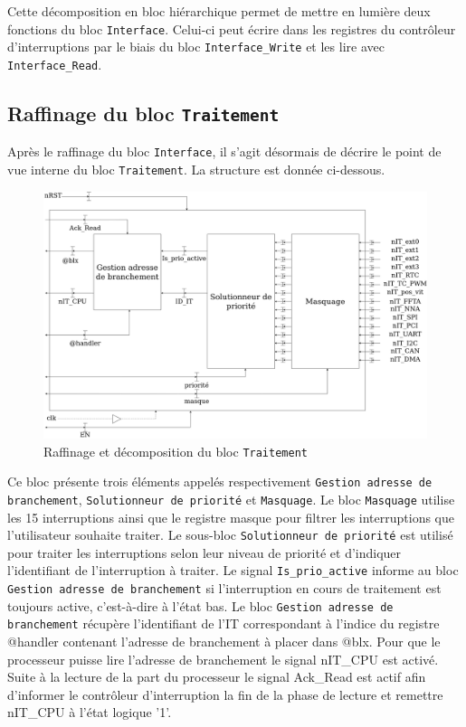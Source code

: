 Cette décomposition en bloc hiérarchique permet de mettre en lumière deux fonctions du bloc \texttt{Interface}.
Celui-ci peut écrire dans les registres du contrôleur d'interruptions par le biais du bloc \texttt{Interface\_Write} et les lire avec \texttt{Interface\_Read}.

\newpage

\subsection{Raffinage du bloc \texttt{Traitement}}

Après le raffinage du bloc \texttt{Interface}, il s'agit désormais de décrire le point de vue interne du bloc \texttt{Traitement}.
La structure est donnée ci-dessous.

\begin{figure}[H]
	\centering
	\includegraphics[width=1\linewidth]{figure/raffinage_traitement.png}
	\caption{Raffinage et décomposition du bloc \texttt{Traitement}}
	\label{fig:raffinage_traitement}
\end{figure}

Ce bloc présente trois éléments appelés respectivement \texttt{Gestion adresse de branchement}, \texttt{Solutionneur de priorité} et \texttt{Masquage}.
Le bloc \texttt{Masquage} utilise les 15 interruptions ainsi que le registre masque pour filtrer les interruptions que l'utilisateur souhaite traiter.
Le sous-bloc \texttt{Solutionneur de priorité} est utilisé pour traiter les interruptions selon leur niveau de priorité et d'indiquer l'identifiant de l'interruption à traiter.
Le signal \texttt{Is\_prio\_active} informe au bloc \texttt{Gestion adresse de branchement} si l'interruption en cours de traitement est toujours active, c'est-à-dire à l'état bas.
Le bloc \texttt{Gestion adresse de branchement} récupère l'identifiant de l'IT correspondant à l'indice du registre @handler contenant l'adresse de branchement à placer dans @blx.
Pour que le processeur puisse lire l'adresse de branchement le signal nIT\_CPU est activé.
Suite à la lecture de la part du processeur le signal Ack\_Read est actif afin d'informer le contrôleur d'interruption la fin de la phase de lecture et remettre nIT\_CPU à l'état logique '1'.  

